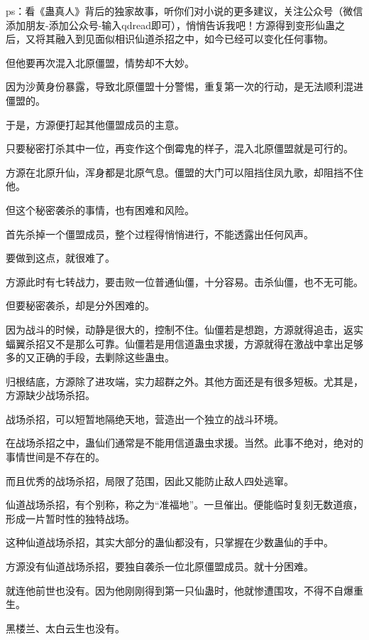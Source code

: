 
\begin{this_body}

ps：看《蛊真人》背后的独家故事，听你们对小说的更多建议，关注公众号（微信添加朋友-添加公众号-输入qdread即可），悄悄告诉我吧！方源得到变形仙蛊之后，又将其融入到见面似相识仙道杀招之中，如今已经可以变化任何事物。

但他要再次混入北原僵盟，情势却不大妙。

因为沙黄身份暴露，导致北原僵盟十分警惕，重复第一次的行动，是无法顺利混进僵盟的。

于是，方源便打起其他僵盟成员的主意。

只要秘密打杀其中一位，再变作这个倒霉鬼的样子，混入北原僵盟就是可行的。

方源在北原升仙，浑身都是北原气息。僵盟的大门可以阻挡住凤九歌，却阻挡不住他。

但这个秘密袭杀的事情，也有困难和风险。

首先杀掉一个僵盟成员，整个过程得悄悄进行，不能透露出任何风声。

要做到这点，就很难了。

方源此时有七转战力，要击败一位普通仙僵，十分容易。击杀仙僵，也不无可能。

但要秘密袭杀，却是分外困难的。

因为战斗的时候，动静是很大的，控制不住。仙僵若是想跑，方源就得追击，返实蝠翼杀招又不是那么可靠。仙僵若是用信道蛊虫求援，方源就得在激战中拿出足够多的又正确的手段，去剿除这些蛊虫。

归根结底，方源除了进攻端，实力超群之外。其他方面还是有很多短板。尤其是，方源缺少战场杀招。

战场杀招，可以短暂地隔绝天地，营造出一个独立的战斗环境。

在战场杀招之中，蛊仙们通常是不能用信道蛊虫求援。当然。此事不绝对，绝对的事情世间是不存在的。

而且优秀的战场杀招，局限了范围，因此又能防止敌人四处逃窜。

仙道战场杀招，有个别称，称之为“准福地”。一旦催出。便能临时复刻无数道痕，形成一片暂时性的独特战场。

这种仙道战场杀招，其实大部分的蛊仙都没有，只掌握在少数蛊仙的手中。

方源没有仙道战场杀招，要独自袭杀一位北原僵盟成员。就十分困难。

就连他前世也没有。因为他刚刚得到第一只仙蛊时，他就惨遭围攻，不得不自爆重生。

黑楼兰、太白云生也没有。


\end{this_body}
